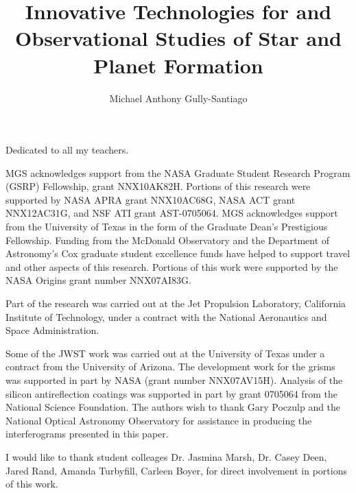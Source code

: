 \documentclass[12pt]{report}	%
\author{Michael Anthony Gully-Santiago}  	%
\title{Innovative Technologies for and Observational Studies of Star and Planet Formation}
\begin{document}
\copyrightpage          %


%
%
%
\commcertpage           %

\titlepage              %



%
\begin{dedication}
%
Dedicated to all my teachers.
\end{dedication}


\begin{acknowledgments}		%
%


MGS acknowledges support from the NASA Graduate Student Research Program (GSRP) Fellowship, grant NNX10AK82H.  Portions of this research were supported by NASA APRA grant NNX10AC68G, NASA ACT grant NNX12AC31G, and NSF ATI grant AST-0705064.  MGS acknowledges support from the University of Texas in the form of the Graduate Dean's Prestigious Fellowship.  Funding from the McDonald Observatory and the Department of Astronomy's Cox graduate student excellence funds have helped to support travel and other aspects of this research.  Portions of this work were supported by the NASA Origins grant number NNX07AI83G.  

Part of the research was carried out at the Jet Propulsion Laboratory, California Institute of Technology, under a contract with the National Aeronautics and Space Administration. 

Some of the JWST work was carried out at the University of Texas under a contract from the University of Arizona.  The development work for the grisms was supported in part by NASA (grant number NNX07AV15H).  Analysis of the silicon antireflection coatings was supported in part by grant 0705064 from the National Science Foundation.  The authors wish to thank Gary Poczulp and the National Optical Astronomy Observatory for assistance in producing the interferograms presented in this paper.

I would like to thank student colleages Dr. Jasmina Marsh, Dr. Casey Deen, Jared Rand, Amanda Turbyfill, Carleen Boyer, for direct involvement in portions of this work.

\end{acknowledgments}
\end{document}
